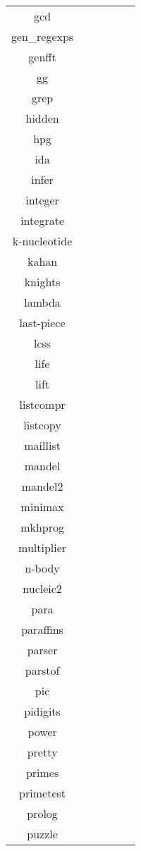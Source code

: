 \begin{tabular}{ c c c c c c }
gcd &  &  &  &  & \\
gen\_regexps &  &  &  &  & \\
genfft &  &  &  &  & \\
gg &  &  &  &  & \\
grep &  &  &  &  & \\
hidden &  &  &  &  & \\
hpg &  &  &  &  & \\
ida &  &  &  &  & \\
infer &  &  &  &  & \\
integer &  &  &  &  & \\
integrate &  &  &  &  & \\
k-nucleotide &  &  &  &  & \\
kahan &  &  &  &  & \\
knights &  &  &  &  & \\
lambda &  &  &  &  & \\
last-piece &  &  &  &  & \\
lcss &  &  &  &  & \\
life &  &  &  &  & \\
lift &  &  &  &  & \\
listcompr &  &  &  &  & \\
listcopy &  &  &  &  & \\
maillist &  &  &  &  & \\
mandel &  &  &  &  & \\
mandel2 &  &  &  &  & \\
minimax &  &  &  &  & \\
mkhprog &  &  &  &  & \\
multiplier &  &  &  &  & \\
n-body &  &  &  &  & \\
nucleic2 &  &  &  &  & \\
para &  &  &  &  & \\
paraffins &  &  &  &  & \\
parser &  &  &  &  & \\
parstof &  &  &  &  & \\
pic &  &  &  &  & \\
pidigits &  &  &  &  & \\
power &  &  &  &  & \\
pretty &  &  &  &  & \\
primes &  &  &  &  & \\
primetest &  &  &  &  & \\
prolog &  &  &  &  & \\
puzzle &  &  &  &  & \\

\end{tabular}
